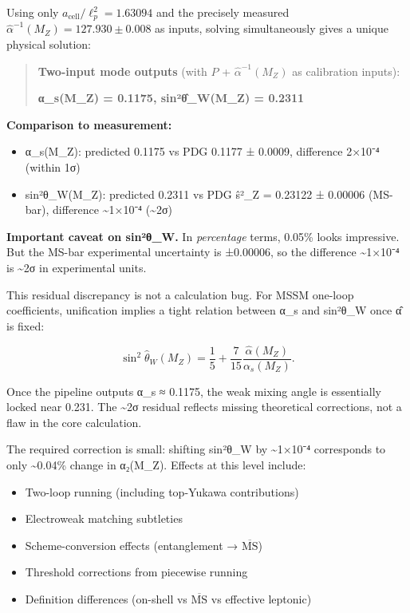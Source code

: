 Using only \(a_{\mathrm{cell}}/\ell_p^2 = 1.63094\) and the precisely measured \(\hat{\alpha}^{-1}(M_Z) = 127.930 \pm 0.008\) as inputs, solving simultaneously gives a unique physical solution:

\begin{quote}
\textbf{Two-input mode outputs} (with $P$ + $\hat{\alpha}^{-1}(M_Z)$ as calibration inputs):

\textbf{α\_s(M\_Z) = 0.1175, sin²\^{θ}\_W(M\_Z) = 0.2311}
\end{quote}

\textbf{Comparison to measurement:}

\begin{itemize}
\tightlist
\item
  α\_s(M\_Z): predicted 0.1175 vs PDG 0.1177 ± 0.0009, difference 2×10⁻⁴ (within 1σ)
\item
  sin²θ\_W(M\_Z): predicted 0.2311 vs PDG \^{s}²\_Z = 0.23122 ± 0.00006 (MS-bar), difference \textasciitilde1×10⁻⁴ (\textasciitilde2σ)
\end{itemize}

\textbf{Important caveat on sin²θ\_W.} In \emph{percentage} terms, 0.05\% looks impressive. But the MS-bar experimental uncertainty is ±0.00006, so the difference \textasciitilde1×10⁻⁴ is \textasciitilde2σ in experimental units.

This residual discrepancy is not a calculation bug. For MSSM one-loop coefficients, unification implies a tight relation between α\_s and sin²θ\_W once \^{α} is fixed:

\[
\sin^2\hat{\theta}_W(M_Z) = \frac{1}{5} + \frac{7}{15}\frac{\hat{\alpha}(M_Z)}{\alpha_s(M_Z)}.
\]

Once the pipeline outputs α\_s ≈ 0.1175, the weak mixing angle is essentially locked near 0.231. The \textasciitilde2σ residual reflects missing theoretical corrections, not a flaw in the core calculation.

The required correction is small: shifting sin²θ\_W by \textasciitilde1×10⁻⁴ corresponds to only \textasciitilde0.04\% change in α₂(M\_Z). Effects at this level include:

\begin{itemize}
\tightlist
\item
  Two-loop running (including top-Yukawa contributions)
\item
  Electroweak matching subtleties
\item
  Scheme-conversion effects (entanglement → \(\overline{\text{MS}}\))
\item
  Threshold corrections from piecewise running
\item
  Definition differences (on-shell vs \(\overline{\text{MS}}\) vs effective leptonic)
\end{itemize}

